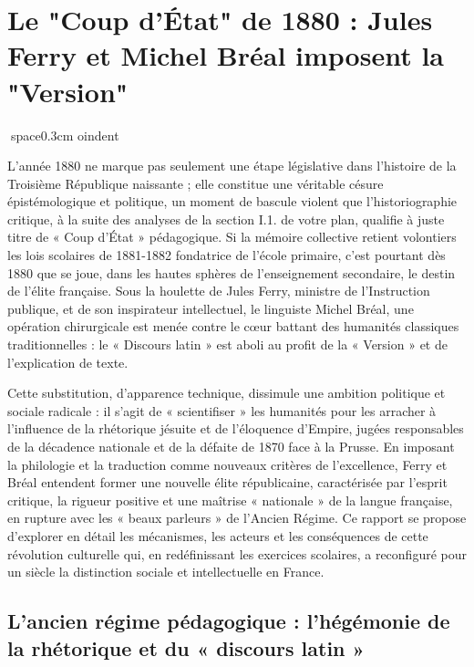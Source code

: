 

\section{Le "Coup d'État" de 1880 : Jules Ferry et Michel Bréal imposent la "Version"}
space{0.3cm}
oindent

L'année 1880 ne marque pas seulement une étape législative dans l'histoire de la Troisième
République naissante ; elle constitue une véritable césure épistémologique et politique, un moment
de bascule violent que l'historiographie critique, à la suite des analyses de la section
I.1.\cite{I-1-2-ref2} de votre plan, qualifie à juste titre de « Coup d'État » pédagogique. Si la
mémoire collective retient volontiers les lois scolaires de 1881-1882 fondatrice de l'école
primaire, c'est pourtant dès 1880 que se joue, dans les hautes sphères de l'enseignement secondaire,
le destin de l'élite française. Sous la houlette de Jules Ferry, ministre de l'Instruction publique,
et de son inspirateur intellectuel, le linguiste Michel Bréal, une opération chirurgicale est menée
contre le cœur battant des humanités classiques traditionnelles : le « Discours latin » est aboli au
profit de la « Version » et de l'explication de texte.\cite{I-1-2-ref1}

Cette substitution, d'apparence technique, dissimule une ambition politique et sociale radicale : il
s'agit de « scientifiser » les humanités pour les arracher à l'influence de la rhétorique jésuite et
de l'éloquence d'Empire, jugées responsables de la décadence nationale et de la défaite de 1870 face
à la Prusse.\cite{I-1-2-ref3} En imposant la philologie et la traduction comme nouveaux critères de
l'excellence, Ferry et Bréal entendent former une nouvelle élite républicaine, caractérisée par
l'esprit critique, la rigueur positive et une maîtrise « nationale » de la langue française, en
rupture avec les « beaux parleurs » de l'Ancien Régime.\cite{I-1-2-ref5} Ce rapport se propose
d'explorer en détail les mécanismes, les acteurs et les conséquences de cette révolution culturelle
qui, en redéfinissant les exercices scolaires, a reconfiguré pour un siècle la distinction sociale
et intellectuelle en France.



\subsection{L'ancien régime pédagogique : l'hégémonie de la rhétorique et du « discours latin »}

